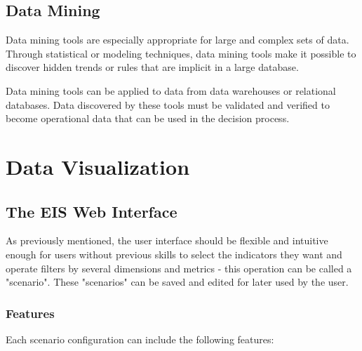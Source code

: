\subsection{Data Mining}

Data mining tools are especially appropriate for large and complex sets of data.
Through statistical or modeling techniques, data mining tools make it possible
to discover hidden trends or rules that are implicit in a large database.

Data mining tools can be applied to data from data warehouses or relational
databases. Data discovered by these tools must be validated and verified to
become operational data that can be used in the decision process.


\section{Data Visualization}

\subsection{The EIS Web Interface}

As previously mentioned, the user interface should be flexible and intuitive
enough for users without previous skills to select the indicators they want and
operate filters by several dimensions and metrics - this operation can be called
a "scenario". These "scenarios" can be saved and edited for later used by the
user.

\subsubsection{Features}

Each scenario configuration can include the following features:

